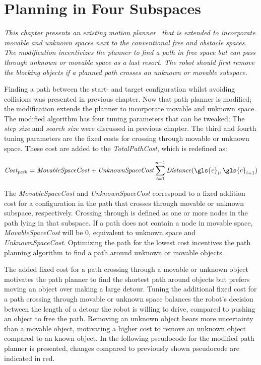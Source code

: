\chapter{Planning in Four Subspaces}%
\label{chap:proposed_planning}
\textit{This chapter presents an existing motion planner~\cite{chen_fast_2018} that is extended to incorporate movable and unknown spaces next to the conventional free and obstacle spaces. The modification incentivizes the planner to find a path in free space but can pass through unknown or movable space as a last resort. The robot should first remove the blocking objects if a planned path crosses an unknown or movable subspace.\bs}

Finding a path between the start- and target configuration whilst avoiding collisions was presented in previous chapter. Now that path planner is modified; the modification extends the planner to incorporate movable and unknown space. The modified algorithm has four tuning parameters that can be tweaked; The \textit{step size} and \textit{search size} were discussed in previous chapter. The third and fourth tuning parameters are the fixed costs for crossing through movable or unknown space. These cost are added to the \textit{TotalPathCost}, which is redefined as:\bs

\[\mathit{Cost_{path}} = \mathit{MovableSpaceCost} + \mathit{UnknownSpaceCost} \sum_{i=1}^{n-1} \mathit{Distance}(\gls{c}_i, \gls{c}_{i+1})\]

The \textit{MovableSpaceCost} and \textit{UnknownSpaceCost} correspond to a fixed addition cost for a configuration in the path that crosses through movable or unknown subspace, respectively. Crossing through is defined as one or more nodes in the path lying in that subspace. If a path does not contain a node in movable space, \textit{MovableSpaceCost} will be 0, equivalent to unknown space and \textit{UnknownSpaceCost}. Optimizing the path for the lowest cost incentives the path planning algorithm to find a path around unknown or movable objects.\bs

The added fixed cost for a path crossing through a movable or unknown object motivates the path planner to find the shortest path around objects but prefers moving an object over making a large detour. Tuning the additional fixed cost for a path crossing through movable or unknown space balances the robot's decision between the length of a detour the robot is willing to drive, compared to pushing an object to free the path. Removing an unknown object bears more uncertainty than a movable object, motivating a higher cost to remove an unknown object compared to an known object. In the following pseudocode for the modified path planner is presented, changes compared to previously shown pseudocode are indicated in red.\bs

